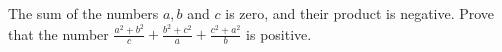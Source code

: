The sum of the numbers $a,b$ and $c$ is zero, and their product is negative.
Prove that the number  $\frac{a^2+b^2}{c}+\frac{b^2+c^2}{a}+\frac{c^2+a^2}{b}$  is positive.